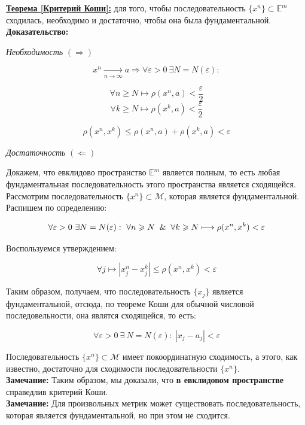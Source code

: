 \documentclass[a4paper,12pt]{article} %
\begin{document}
\underline{\textbf{Теорема [Критерий Коши]:}} для того, чтобы последовательность $\{x^n \} \subset \mathbb{E}^m$ сходилась, необходимо и достаточно, чтобы она была фундаментальной.\\

\textbf{Доказательство:} 

\textit{Необходимость} $(\Rightarrow)$

\[ x^n \xrightarrow[n \to \infty]{} a \Rightarrow \forall \varepsilon > 0 ~ \exists N = N(\varepsilon) : \]

\[ \forall n \geqslant N \mapsto \rho(x^n, a) < \frac{\varepsilon}{2} \]
\[ \forall k \geqslant N \mapsto \rho(x^k, a) < \frac{\varepsilon}{2} \]

\[ \rho(x^n, x^k) \leqslant \rho(x^n, a) + \rho(x^k, a) < \varepsilon \]

\textit{Достаточность} $(\Leftarrow)$ 

Докажем, что евклидово пространство $\mathbb{E}^m$ является полным, то есть любая фундаментальная последовательность этого пространства является сходящейся.\\

Рассмотрим последовательность $\{x^n \} \subset \mathscr{M}$, которая является фундаментальной. Распишем по определению:

$$ \forall \varepsilon > 0 ~ \exists N = N(\varepsilon) : ~ \forall n \geqslant N \And \forall k \geqslant N \longmapsto \rho(x^n, x^k) < \varepsilon $$

Воспользуемся утверждением:

\[ \forall j \longmapsto |x_j^n - x_j^k| \leqslant \rho(x^n, x^k) < \varepsilon \]

Таким образом, получаем, что последовательность $\{ x_j \}$ является фундаментальной, отсюда, по теореме Коши для обычной числовой последовельности, она являтся сходящейся, то есть:

\[ \forall \varepsilon > 0 ~ \exists ~ N = N(\varepsilon) : ~ |x_j - a_j| < \varepsilon \]

Последовательность $\{x^n \} \subset \mathscr{M}$ имеет покоординатную сходимость, а этого, как известно, достаточно для сходимости последовательности $\{x^n \}$.\\

\textbf{Замечание:} Таким образом, мы доказали, что \textbf{в евклидовом пространстве} справедлив критерий Коши.\\

\textbf{Замечание:} Для произвольных метрик может существовать последовательность, которая является фундаментальной, но при этом не сходится.\\
\end{document}
